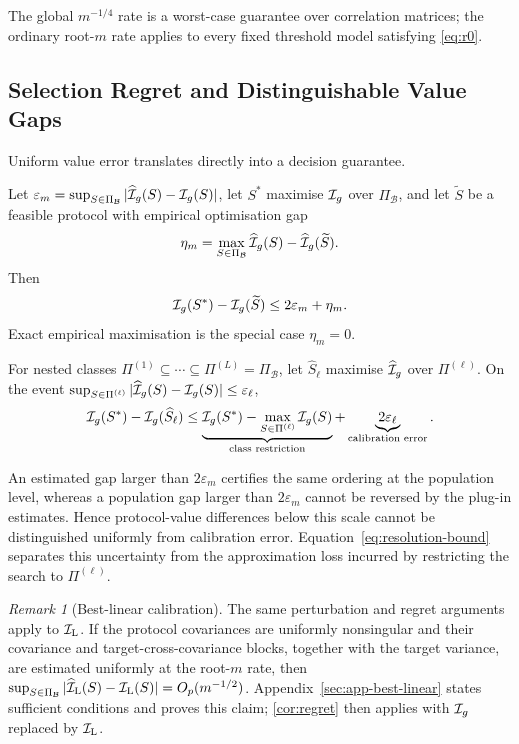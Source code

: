 The global $m^{-1/4}$ rate is a worst-case guarantee over correlation matrices;
the ordinary root-$m$ rate applies to every fixed threshold model satisfying
\eqref{eq:r0}.

\subsection{Selection Regret and Distinguishable Value Gaps}

Uniform value error translates directly into a decision guarantee.

\begin{corollary}
\label{cor:regret}
Let
$\varepsilon_m=\sup_{S\in\Pi_{\mathcal B}}|\widehat{\mathcal{I}}_g(S)-\mathcal{I}_g(S)|$, let $S^*$
maximise $\mathcal{I}_g$ over $\Pi_{\mathcal B}$, and let $\widetilde S$ be a feasible
protocol with empirical optimisation gap
\begin{equation}
\eta_m=\max_{S\in\Pi_{\mathcal B}}\widehat{\mathcal{I}}_g(S)
-\widehat{\mathcal{I}}_g(\widetilde S).
\label{eq:opt-gap}
\end{equation}
Then
\begin{equation}
\mathcal{I}_g(S^*)-\mathcal{I}_g(\widetilde S)\le2\varepsilon_m+\eta_m.
\label{eq:regret-opt}
\end{equation}
Exact empirical maximisation is the special case $\eta_m=0$.

For nested classes
$\Pi^{(1)}\subseteq\cdots\subseteq\Pi^{(L)}=\Pi_{\mathcal B}$, let
$\widehat S_\ell$ maximise $\widehat{\mathcal{I}}_g$ over $\Pi^{(\ell)}$. On the event
$\sup_{S\in\Pi^{(\ell)}}|\widehat{\mathcal{I}}_g(S)-\mathcal{I}_g(S)|\le\varepsilon_\ell$,
\begin{equation}
\mathcal{I}_g(S^*)-\mathcal{I}_g(\widehat S_\ell)\le
\underbrace{\mathcal{I}_g(S^*)-
\max_{S\in\Pi^{(\ell)}}\mathcal{I}_g(S)}_{\text{class restriction}}
+\underbrace{2\varepsilon_\ell}_{\text{calibration error}}.
\label{eq:resolution-bound}
\end{equation}
\end{corollary}

An estimated gap larger than $2\varepsilon_m$ certifies the same ordering at
the population level, whereas a population gap larger than $2\varepsilon_m$
cannot be reversed by the plug-in estimates. Hence protocol-value differences
below this scale cannot be distinguished uniformly from calibration error.
Equation~\eqref{eq:resolution-bound} separates this uncertainty from the
approximation loss incurred by restricting the search to $\Pi^{(\ell)}$.

\theoremstyle{remark}
\newtheorem*{bestlinearremark}{Remark}
\begin{bestlinearremark}[Best-linear calibration]
The same perturbation and regret arguments apply to $\mathcal{I}_{\mathrm L}$. If the
protocol covariances are uniformly nonsingular and their covariance and
target-cross-covariance blocks, together with the target variance, are
estimated uniformly at the root-$m$ rate, then
$\sup_{S\in\Pi_{\mathcal B}}|\widehat{\mathcal{I}}_{\mathrm L}(S)-\mathcal{I}_{\mathrm L}(S)|
=O_p(m^{-1/2})$. Appendix~\ref{sec:app-best-linear} states sufficient
conditions and proves this claim; \cref{cor:regret} then applies with
$\mathcal{I}_g$ replaced by $\mathcal{I}_{\mathrm L}$.
\end{bestlinearremark}
